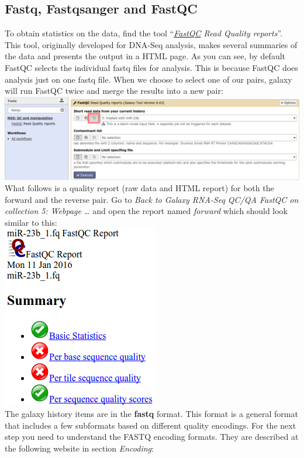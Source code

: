\subsection{Fastq, Fastqsanger and FastQC}
To obtain statistics on the data, find the tool ``\textit{\underline{FastQC} Read Quality reports}''. This tool, originally developed for DNA-Seq analysis, makes several summaries of the data and presents the output in a HTML page. As you can see, by default FastQC selects the individual fastq files for analysis. This is because FastQC does analysis just on one fastq file. When we choose to select one of our pairs, galaxy will run FastQC twice and merge the results into a new pair:\\
\includegraphics[width=\textwidth]{figures/qc_03.png}\\
What follows is a quality report (raw data and HTML report) for both the forward and the reverse pair. Go to \textit{Back to Galaxy RNA-Seq QC/QA FastQC on collection 5: Webpage \ldots} and open the report named \textit{forward} which should look similar to this:\\
\includegraphics[scale=0.65]{figures/qc_04.png}\\
The galaxy history items are in the \textbf{fastq} format. This format is a general format that includes a few subformats based on different quality encodings. For the next step you need to understand the FASTQ encoding formats. They are described at the following website in section \textit{Encoding}:\\

